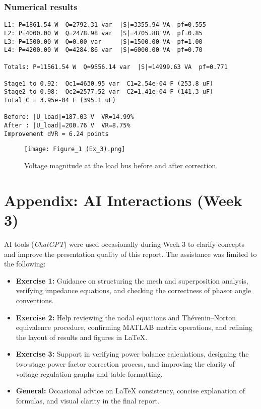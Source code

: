 \documentclass[a4paper,12pt]{article}
\begin{document}
\subsubsection*{Numerical results}
\begin{verbatim}
L1: P=1861.54 W  Q=2792.31 var  |S|=3355.94 VA  pf=0.555
L2: P=4000.00 W  Q=2478.98 var  |S|=4705.88 VA  pf=0.85
L3: P=1500.00 W  Q=0.00 var     |S|=1500.00 VA  pf=1.00
L4: P=4200.00 W  Q=4284.86 var  |S|=6000.00 VA  pf=0.70

Totals: P=11561.54 W  Q=9556.14 var  |S|=14999.63 VA  pf=0.771

Stage1 to 0.92:  Qc1=4630.95 var  C1=2.54e-04 F (253.8 uF)
Stage2 to 0.98:  Qc2=2577.52 var  C2=1.41e-04 F (141.3 uF)
Total C = 3.95e-04 F (395.1 uF)

Before: |U_load|=187.03 V  VR=14.99%
After : |U_load|=200.76 V  VR=8.75%
Improvement dVR = 6.24 points
\end{verbatim}

\begin{figure}[H]
\centering
\texttt{[image: Figure\_1 (Ex\_3).png]}
\caption{Voltage magnitude at the load bus before and after correction.}
\label{fig:ex3_pf_bar}
\end{figure}


\section*{Appendix: AI Interactions (Week 3)}
AI tools (\textit{ChatGPT}) were used occasionally during Week 3 to clarify concepts and improve the presentation quality of this report. 
The assistance was limited to the following:

\begin{itemize}
    \item \textbf{Exercise 1:} Guidance on structuring the mesh and superposition analysis, verifying impedance equations, and checking the correctness of phasor angle conventions.
    
    \item \textbf{Exercise 2:} Help reviewing the nodal equations and Thévenin–Norton equivalence procedure, confirming MATLAB matrix operations, and refining the layout of results and figures in \LaTeX.
    
    \item \textbf{Exercise 3:} Support in verifying power balance calculations, designing the two-stage power factor correction process, and improving the clarity of voltage-regulation graphs and table formatting.
    
    \item \textbf{General:} Occasional advice on \LaTeX{} consistency, concise explanation of formulas, and visual clarity in the final report.
\end{itemize}
\end{document}
